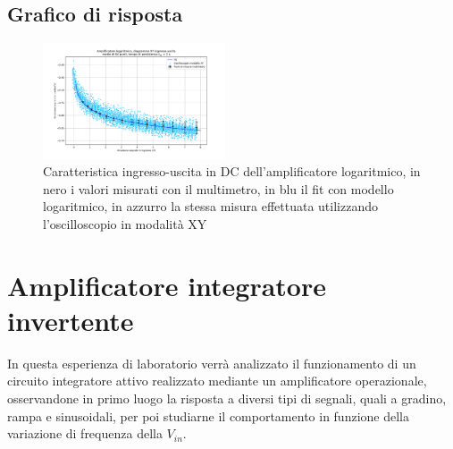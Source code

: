 \documentclass[journal]{IEEEtran}
\begin{document}
\subsection{Grafico di risposta}

\begin{figure}[H]%
\begin {center}
\includegraphics[trim = {100px 0 0 0}, width=0.48\textwidth]{analysis/output/OPA-log-fitted.pdf}
\caption{Caratteristica ingresso-uscita in DC dell'amplificatore logaritmico, in nero i valori misurati con il multimetro, in blu il fit con modello logaritmico, in azzurro la stessa misura effettuata utilizzando l'oscilloscopio in modalità XY}
\label{fig:log_ampl_fit_xy}
\end {center}
\end{figure}


\section{\textbf{Amplificatore integratore invertente}} %
In questa esperienza di laboratorio verrà analizzato il funzionamento di un circuito integratore attivo realizzato mediante un amplificatore operazionale, osservandone in primo luogo la risposta a diversi tipi di segnali, quali a gradino, rampa e sinusoidali, per poi studiarne il comportamento in funzione della variazione di frequenza della $V_{in}$.
\end{document}
